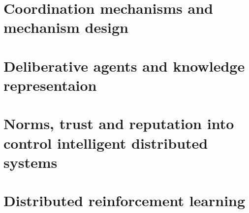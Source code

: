 \documentclass[ngerman]{scrartcl}
\begin{document}
\section{Coordination mechanisms and mechanism design}




\section{Deliberative agents and knowledge representaion}




\section{Norms, trust and reputation into control intelligent distributed systems}




\section{Distributed reinforcement learning}
\end{document}
